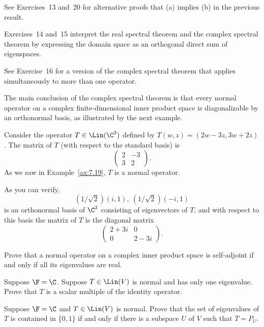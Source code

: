 See Exercises~13 and~20 for alternative proofs that (a) implies (b) in the
previous result.

Exercises~14 and~15 interpret the real spectral theorem and the complex
spectral theorem by expressing the domain space as an orthogonal direct sum of
eigenspaces.

See Exercise~16 for a version of the complex spectral theorem that applies
simultaneously to more than one operator.

The main conclusion of the complex spectral theorem is that every normal
operator on a complex finite-dimensional inner product space is diagonalizable
by an orthonormal basis, as illustrated by the next example.

\begin{example}%
\label{ax:7.33}
Consider the operator $T\in\Lin(\C^2)$ defined by $T(w,z)=(2w-3z,3w+2z)$. The
matrix of $T$ (with respect to the standard basis) is
\[ \begin{pmatrix} 2 & -3\\ 3 & 2 \end{pmatrix}. \]
As we saw in Example~\ref{ax:7.19}, $T$ is a normal operator.

As you can verify,
\[ (1/\sqrt2)(i,1),\ (1/\sqrt2)(-i,1) \]
is an orthonormal basis of $\C^2$ consisting of eigenvectors of $T$, and with
respect to this basis the matrix of $T$ is the diagonal matrix
\[ \begin{pmatrix} 2+3i & 0\\ 0 & 2-3i \end{pmatrix}. \]
\end{example}


\begin{exercise}
Prove that a normal operator on a complex inner product space is self-adjoint
if and only if all its eigenvalues are real.
\end{exercise}

\begin{exercise}
Suppose $\F=\C$. Suppose $T\in\Lin(V)$ is normal and has only one eigenvalue.
Prove that $T$ is a scalar multiple of the identity operator.
\end{exercise}

\begin{exercise}
Suppose $\F=\C$ and $T\in\Lin(V)$ is normal. Prove that the set of eigenvalues
of $T$ is contained in $\{0,1\}$ if and only if there is a subspace $U$ of $V$
such that $T=P_U$.
\end{exercise}

